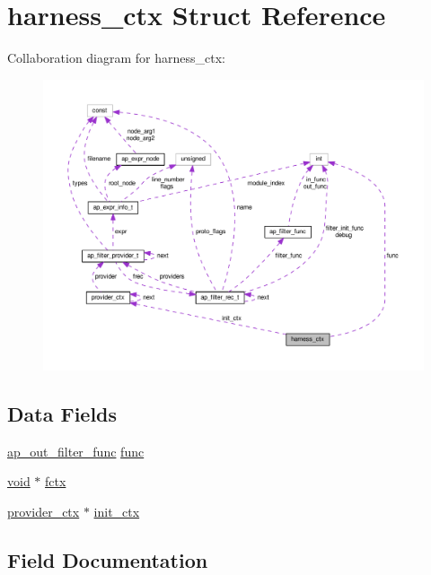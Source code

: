\hypertarget{structharness__ctx}{}\section{harness\+\_\+ctx Struct Reference}
\label{structharness__ctx}


Collaboration diagram for harness\+\_\+ctx\+:
\nopagebreak
\begin{figure}[H]
\begin{center}
\leavevmode
\includegraphics[width=350pt]{structharness__ctx__coll__graph}
\end{center}
\end{figure}
\subsection*{Data Fields}
\begin{DoxyCompactItemize}
\item 
\hyperlink{group__APACHE__CORE__FILTER_ga5c80541a5a1dcc9a383e90aa82be59b3}{ap\+\_\+out\+\_\+filter\+\_\+func} \hyperlink{structharness__ctx_a03f0d2120c19cd859c01a8ceb1e81816}{func}
\item 
\hyperlink{group__MOD__ISAPI_gacd6cdbf73df3d9eed42fa493d9b621a6}{void} $\ast$ \hyperlink{structharness__ctx_a29824598296f9f6ceb68137153400ba6}{fctx}
\item 
\hyperlink{structprovider__ctx}{provider\+\_\+ctx} $\ast$ \hyperlink{structharness__ctx_a460c327d5b6a4230a87521930c8f4e9f}{init\+\_\+ctx}
\end{DoxyCompactItemize}


\subsection{Field Documentation}
